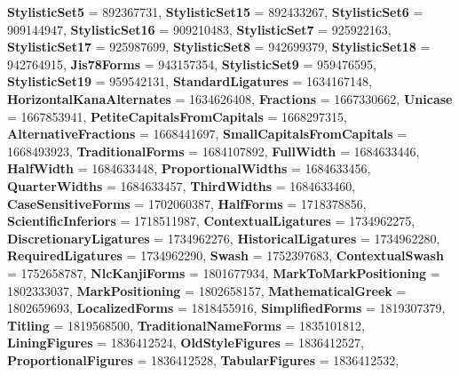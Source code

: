 \begin{DoxyCompactItemize}
{\bfseries Stylistic\+Set5} = 892367731, 
\newline
{\bfseries Stylistic\+Set15} = 892433267, 
{\bfseries Stylistic\+Set6} = 909144947, 
{\bfseries Stylistic\+Set16} = 909210483, 
{\bfseries Stylistic\+Set7} = 925922163, 
\newline
{\bfseries Stylistic\+Set17} = 925987699, 
{\bfseries Stylistic\+Set8} = 942699379, 
{\bfseries Stylistic\+Set18} = 942764915, 
{\bfseries Jis78\+Forms} = 943157354, 
\newline
{\bfseries Stylistic\+Set9} = 959476595, 
{\bfseries Stylistic\+Set19} = 959542131, 
{\bfseries Standard\+Ligatures} = 1634167148, 
{\bfseries Horizontal\+Kana\+Alternates} = 1634626408, 
\newline
{\bfseries Fractions} = 1667330662, 
{\bfseries Unicase} = 1667853941, 
{\bfseries Petite\+Capitals\+From\+Capitals} = 1668297315, 
{\bfseries Alternative\+Fractions} = 1668441697, 
\newline
{\bfseries Small\+Capitals\+From\+Capitals} = 1668493923, 
{\bfseries Traditional\+Forms} = 1684107892, 
{\bfseries Full\+Width} = 1684633446, 
{\bfseries Half\+Width} = 1684633448, 
\newline
{\bfseries Proportional\+Widths} = 1684633456, 
{\bfseries Quarter\+Widths} = 1684633457, 
{\bfseries Third\+Widths} = 1684633460, 
{\bfseries Case\+Sensitive\+Forms} = 1702060387, 
\newline
{\bfseries Half\+Forms} = 1718378856, 
{\bfseries Scientific\+Inferiors} = 1718511987, 
{\bfseries Contextual\+Ligatures} = 1734962275, 
{\bfseries Discretionary\+Ligatures} = 1734962276, 
\newline
{\bfseries Historical\+Ligatures} = 1734962280, 
{\bfseries Required\+Ligatures} = 1734962290, 
{\bfseries Swash} = 1752397683, 
{\bfseries Contextual\+Swash} = 1752658787, 
\newline
{\bfseries Nlc\+Kanji\+Forms} = 1801677934, 
{\bfseries Mark\+To\+Mark\+Positioning} = 1802333037, 
{\bfseries Mark\+Positioning} = 1802658157, 
{\bfseries Mathematical\+Greek} = 1802659693, 
\newline
{\bfseries Localized\+Forms} = 1818455916, 
{\bfseries Simplified\+Forms} = 1819307379, 
{\bfseries Titling} = 1819568500, 
{\bfseries Traditional\+Name\+Forms} = 1835101812, 
\newline
{\bfseries Lining\+Figures} = 1836412524, 
{\bfseries Old\+Style\+Figures} = 1836412527, 
{\bfseries Proportional\+Figures} = 1836412528, 
{\bfseries Tabular\+Figures} = 1836412532, 
\newline

\end{DoxyCompactItemize}
